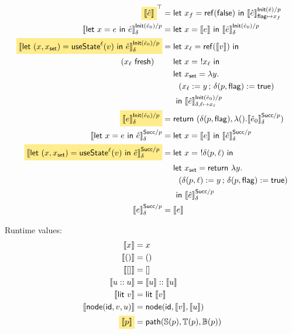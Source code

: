 \documentclass{article}
\newcommand{\mf}[1]{\mathsf{#1}}
\newcommand{\semi}{\,;\,}
\newcommand{\mhl}[1]{\colorbox{LightGoldenrod1}{$#1$}}
\newcommand{\llrr}[1]{\llbracket #1 \rrbracket}
\newcommand{\elet}[3]{\mf{let}\ #1 = #2\ \mf{in}\ #3}
\newcommand{\eret}[1]{\mf{return}\ #1}
\newcommand{\estate}[4]{\mf{let}\ (#1, #1_{\mf{set}}) = \mf{useState}^{#2}(#3)\ \mf{in}\ #4}
\newcommand{\eref}[1]{\mf{ref}(#1)}
\newcommand{\eget}[1]{\ !#1}
\newcommand{\eset}[2]{#1 := #2}
\newcommand{\elit}[1]{\mf{lit}\ #1}
\newcommand{\enode}[3]{\mf{node}(\mf{#1}, #2, #3)}
\begin{document}



\begin{align*}
\mhl{\llrr{\hat{e}}}^\top &= \elet{x_f}{\eref{\mf{false}}}
{\llrr{\hat{e}}^{\mf{Init}(\hat{e})/p}_{\mf{flag} \mapsto x_f}}\\
\llrr{\elet{x}{e}{\hat{e}}}^{\mf{Init}(\hat{e}_0)/p}_{\delta}
&= \elet{x}{\llrr{e}}{\llrr{\hat{e}}^{\mf{Init}(\hat{e}_0)/p}_\delta}\\
\mhl{\llrr{\estate{x}{\ell}{v}{\hat{e}}}^{\mf{Init}(\hat{e}_0)/p}_\delta}
&= \elet{x_\ell}{\eref{\llrr{v}}}{\\
  (x_\ell\ \mf{fresh})\quad&\quad\ \elet{x}{\eget{x_\ell}}{\\
    &\quad\ \elet{x_\mf{set}}{\lambda y.\\
      &\qquad(\eset{x_\ell}{y} \semi \eset{\delta(p, \mf{flag})}{\mf{true}})
      \\&\quad\ 
    }{\llrr{\hat{e}}^{\mf{Init}(\hat{e}_0)/p}_{\delta,\ell \mapsto x_\ell}}
  }
}\\
\mhl{\llrr{e}^{\mf{Init}(\hat{e}_0)/p}_\delta}
&= \eret{(\delta(p, \mf{flag}), 
\lambda ().\llrr{\hat{e}_0}^{\mf{Succ}/p}_\delta)}\\
\llrr{\elet{x}{e}{\hat{e}}}^{\mf{Succ}/p}_\delta
&= \elet{x}{\llrr{e}}{\llrr{\hat{e}}^{\mf{Succ}/p}_\delta}\\
\mhl{\llrr{\estate{x}{\ell}{v}{\hat{e}}}^{\mf{Succ}/p}_\delta}
&= \elet{x}{\eget{\delta(p, \ell)}}{\\
    &\quad\ \elet{x_\mf{set}}{\eret{\lambda y.\\
      &\qquad(\eset{\delta(p, \ell)}{y} 
        \semi 
        \eset{\delta(p, \mf{flag})}{\mf{true}}
      )\\&\quad\
    }}
  \llrr{\hat{e}}^{\mf{Succ}/p}_\delta}
\\
\llrr{e}^{\mf{Succ}/p}_\delta &= \llrr{e}
\end{align*}

Runtime values:
\begin{align*}
\llrr{x} &= x\\
\llrr{()} &= ()\\
\llrr{[]} &= []\\
\llrr{u :: u} &= \llrr{u} :: \llrr{u}\\
\llrr{\elit{v}} &= \elit{\llrr{v}}\\
\llrr{\enode{id}{v}{u}} &= \enode{id}{\llrr{v}}{\llrr{u}}\\
\mhl{\llrr{p}} &= \mf{path}(\mathbb{S}(p), \mathbb{T}(p), \mathbb{B}(p))
\end{align*}
\end{document}
